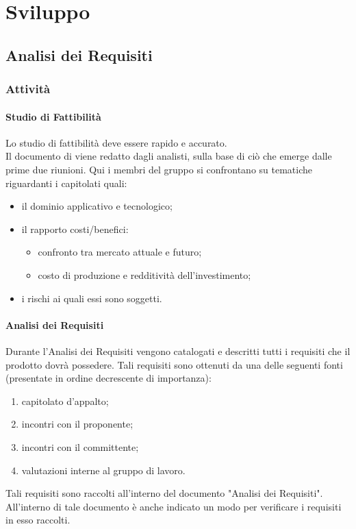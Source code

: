 \section{Sviluppo}
	\subsection{Analisi dei Requisiti}
		\subsubsection{Attività}
			\paragraph{Studio di Fattibilità}
				Lo studio di fattibilità deve essere rapido e accurato.\\
				Il documento di  viene redatto dagli analisti, sulla base di ciò che emerge dalle prime due riunioni. Qui i membri del gruppo si confrontano su tematiche riguardanti i capitolati quali:
				\begin{itemize}
					\item il dominio applicativo e tecnologico;
					\item il rapporto costi/benefici:
					\begin{itemize}
						\item confronto tra mercato attuale e futuro;
						\item costo di produzione e redditività dell'investimento;
					\end{itemize}
					\item i rischi ai quali essi sono soggetti.
				\end{itemize}
			\paragraph{Analisi dei Requisiti}
				Durante l'Analisi dei Requisiti vengono catalogati e descritti tutti i requisiti che il prodotto dovrà possedere. Tali requisiti sono ottenuti da una delle seguenti fonti (presentate in ordine decrescente di importanza):
				\begin{enumerate}
					\item capitolato d’appalto;
					\item incontri con il proponente;
					\item incontri con il committente;
					\item valutazioni interne al gruppo di lavoro.
				\end{enumerate}
				Tali requisiti sono raccolti all'interno del documento "Analisi dei Requisiti". All'interno di tale documento è anche indicato un modo per verificare i requisiti in esso raccolti.
